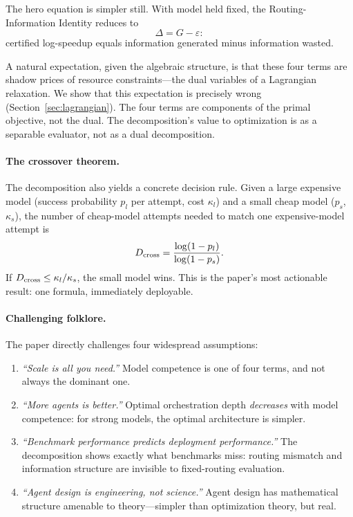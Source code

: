 The hero equation is simpler still.
With model held fixed, the Routing-Information Identity reduces to
\[
\Delta = G - \varepsilon:
\]
certified log-speedup equals information generated minus information wasted.

A natural expectation, given the algebraic structure, is that these four terms are shadow prices of resource constraints---the dual variables of a Lagrangian relaxation.
We show that this expectation is precisely wrong (Section~\ref{sec:lagrangian}).
The four terms are components of the primal objective, not the dual.
The decomposition's value to optimization is as a separable evaluator, not as a dual decomposition.

\paragraph{The crossover theorem.}
The decomposition also yields a concrete decision rule.
Given a large expensive model (success probability $p_l$ per attempt, cost $\kappa_l$) and a small cheap model ($p_s$, $\kappa_s$), the number of cheap-model attempts needed to match one expensive-model attempt is
\begin{equation}
\label{eq:crossover-intro}
D_{\mathrm{cross}} = \frac{\log(1 - p_l)}{\log(1 - p_s)}.
\end{equation}
If $D_{\mathrm{cross}} \le \kappa_l/\kappa_s$, the small model wins.
This is the paper's most actionable result: one formula, immediately deployable.

\paragraph{Challenging folklore.}
The paper directly challenges four widespread assumptions:

\begin{enumerate}
\item \emph{``Scale is all you need.''}\;
Model competence is one of four terms, and not always the dominant one.

\item \emph{``More agents is better.''}\;
Optimal orchestration depth \emph{decreases} with model competence: for strong models, the optimal architecture is simpler.

\item \emph{``Benchmark performance predicts deployment performance.''}\;
The decomposition shows exactly what benchmarks miss: routing mismatch and information structure are invisible to fixed-routing evaluation.

\item \emph{``Agent design is engineering, not science.''}\;
Agent design has mathematical structure amenable to theory---simpler than optimization theory, but real.
\end{enumerate}

